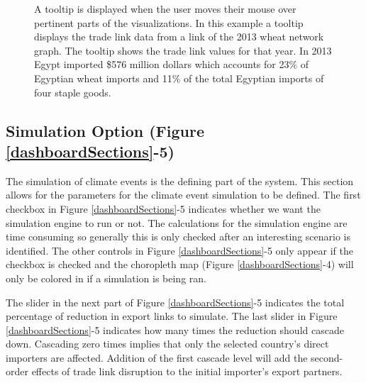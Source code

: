 		\begin{figure}[htb]
			\caption[TOOLTIP OF A LINK IN THE NETWORK GRAPH]{A tooltip is displayed when the user moves their mouse over pertinent parts of the visualizations. In this example a tooltip displays the trade link data from a link of the 2013 wheat network graph. The tooltip shows the trade link values for that year. In 2013 Egypt imported \$576 million dollars which accounts for 23\% of Egyptian wheat imports and 11\% of the total Egyptian imports of four staple goods.}
			\label{tooltip}
		\end{figure}
		\subsection{Simulation Option (Figure \ref{dashboardSections}-5)}
			The simulation of climate events is the defining part of the system. This section allows for the parameters for the climate event simulation to be defined. The first checkbox in Figure \ref{dashboardSections}-5 indicates whether we want the simulation engine to run or not. The calculations for the simulation engine are time consuming so generally this is only checked after an interesting scenario is identified. The other controls in Figure \ref{dashboardSections}-5 only appear if the checkbox is checked and the choropleth map (Figure \ref{dashboardSections}-4) will only be colored in if a simulation is being ran.\par
			The slider in the next part of Figure \ref{dashboardSections}-5 indicates the total percentage of reduction in export links to simulate. The last slider in Figure \ref{dashboardSections}-5 indicates how many times the reduction should cascade down. Cascading zero times implies that only the selected country's direct importers are affected. Addition of the first cascade level will add the second-order effects of trade link disruption to the initial importer's export partners.\par
